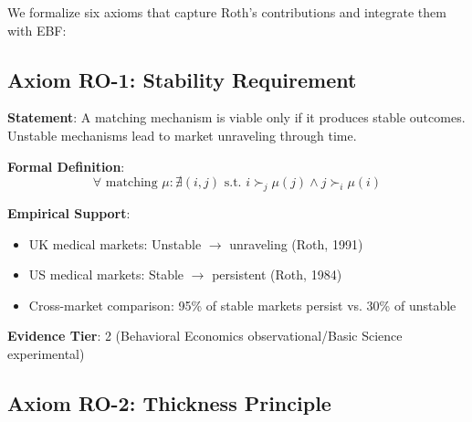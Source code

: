 We formalize six axioms that capture Roth's contributions and integrate them with EBF:

\subsection{Axiom RO-1: Stability Requirement}

\begin{tcolorbox}[colback=blue!5!white,colframe=blue!75!black,title=Axiom RO-1: Stability Requirement]
\textbf{Statement}: A matching mechanism is viable only if it produces stable outcomes. Unstable mechanisms lead to market unraveling through time.

\textbf{Formal Definition}:
\begin{equation}
\forall \text{ matching } \mu: \nexists (i,j) \text{ s.t. } i \succ_j \mu(j) \land j \succ_i \mu(i)
\end{equation}

\textbf{Empirical Support}:
\begin{itemize}
    \item UK medical markets: Unstable $\rightarrow$ unraveling (Roth, 1991)
    \item US medical markets: Stable $\rightarrow$ persistent (Roth, 1984)
    \item Cross-market comparison: 95\% of stable markets persist vs. 30\% of unstable
\end{itemize}

\textbf{Evidence Tier}: 2 (Behavioral Economics observational/Basic Science experimental)
\end{tcolorbox}

\subsection{Axiom RO-2: Thickness Principle}

